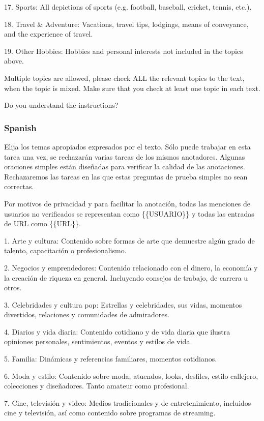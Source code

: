 17. Sports: All depictions of sports (e.g. football, baseball, cricket, tennis, etc.). 

18. Travel \& Adventure: Vacations, travel tips, lodgings, means of conveyance, and the experience of travel.

19. Other Hobbies: Hobbies and personal interests not included in the topics above.

Multiple topics are allowed, please check ALL the relevant topics to the text, when the topic is mixed.
Make sure that you check at least one topic in each text.
 
Do you understand the instructions?

\subsubsection{Spanish}
Elija los temas apropiados expresados por el texto.
Sólo puede trabajar en esta tarea una vez, se rechazarán varias tareas de los mismos anotadores.
Algunas oraciones simples están diseñadas para verificar la calidad de las anotaciones. Rechazaremos las tareas en las que estas preguntas de prueba simples no sean correctas.

Por motivos de privacidad y para facilitar la anotación, todas las menciones de usuarios no verificados se representan como \{\{USUARIO\}\} y todas las entradas de URL como \{\{URL\}\}.

1. Arte y cultura: Contenido sobre formas de arte que demuestre algún grado de talento, capacitación o profesionalismo.

2. Negocios y emprendedores: Contenido relacionado con el dinero, la economía y la creación de riqueza en general. Incluyendo consejos de trabajo, de carrera u otros.

3. Celebridades y cultura pop: Estrellas y celebridades, sus vidas, momentos divertidos, relaciones y comunidades de admiradores.

4. Diarios y vida diaria: Contenido cotidiano y de vida diaria que ilustra opiniones personales, sentimientos, eventos y estilos de vida.

5. Familia: Dinámicas y referencias familiares, momentos cotidianos.

6. Moda y estilo: Contenido sobre moda, atuendos, looks, desfiles, estilo callejero, colecciones y diseñadores. Tanto amateur como profesional.

7. Cine, televisión y video: Medios tradicionales y de entretenimiento, incluidos cine y televisión, así como contenido sobre programas de streaming.

